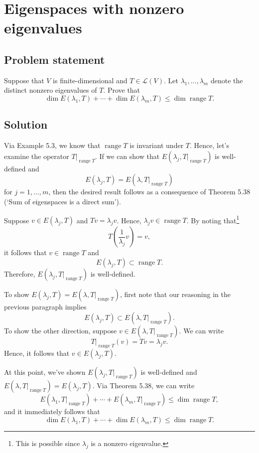 \documentclass{article}
\begin{document}
\clearpage

\renewcommand{\thesection}{10}
\section{Eigenspaces with nonzero eigenvalues}
\subsection*{Problem statement}
Suppose that $V$ is finite-dimensional and $T\in\mathcal{L}(V)$. 
Let $\lambda_1,\ldots,\lambda_m$ denote the distinct nonzero eigenvalues of $T$. 
Prove that
\[\dim E(\lambda_1,T)+\cdots+\dim E(\lambda_m,T)\leq \dim\operatorname{range}T.\]

\subsection*{Solution}
Via Example 5.3, we know that $\operatorname{range}T$ is invariant under $T$. 
Hence, let's examine the operator $T|_{\operatorname{range}T}$. If we can show that $E(\lambda_j,T|_{\operatorname{range}T})$ is well-defined and
\[E(\lambda_j,T)=E(\lambda,T|_{\operatorname{range}T})\]
for $j=1,\ldots,m$, then the desired result follows as a consequence of Theorem 5.38 (`Sum of eigenspaces is a direct sum').

Suppose $v\in E(\lambda_j,T)$ and $Tv=\lambda_j v$. 
Hence, $\lambda_jv\in \operatorname{range}T$. 
By noting that\footnote{This is possible since $\lambda_j$ is a nonzero eigenvalue.}
\[T(\frac{1}{\lambda_j}v)=v,\]
it follows that $v\in\operatorname{range}T$ and
\[E(\lambda_j,T)\subset \operatorname{range}T.\]
Therefore, $E(\lambda_j,T|_{\operatorname{range}T})$ is well-defined.

To show $E(\lambda_j,T)=E(\lambda,T|_{\operatorname{range}T})$, first note that our reasoning in the previous paragraph implies
\[E(\lambda_j,T)\subset E(\lambda,T|_{\operatorname{range}T}).\]
To show the other direction, suppose $v\in E(\lambda,T|_{\operatorname{range}T})$. 
We can write
\[T|_{\operatorname{range}T}(v)=Tv=\lambda_j v.\]
Hence, it follows that $v\in E(\lambda_j,T)$.

At this point, we've shown $E(\lambda_j,T|_{\operatorname{range}T})$ is well-defined and\newline $E(\lambda,T|_{\operatorname{range}T})=E(\lambda_j,T)$. 
Via Theorem 5.38, we can write
\[E(\lambda_1,T|_{\operatorname{range}T})+\cdots+E(\lambda_m,T|_{\operatorname{range}T})\leq \dim\operatorname{range}T,\]
and it immediately follows that
\[\dim E(\lambda_1,T)+\cdots+\dim E(\lambda_m,T)\leq \dim\operatorname{range}T.\]
\end{document}
